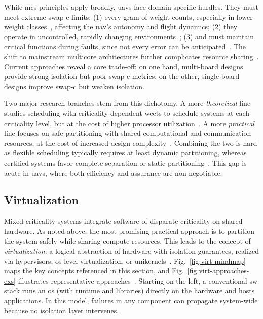While \gls{mcs} principles apply broadly, \glspl{uav} face domain-specific
hurdles. They must meet extreme \gls{swap-c} limits: (1) every gram of weight
counts, especially in lower weight classes~\cite{alladi2022UAVBlockain}, affecting the \gls{uav}'s autonomy
and flight dynamics; (2) they operate in uncontrolled,
rapidly changing environments~\cite{faical_adaptive_2017}; (3) and must maintain critical functions during faults, since not every error can be
anticipated~\cite{mohsan2022towards}.
The
shift to mainstream multicore architectures further complicates resource
sharing~\cite{burns2022mixed}. Current approaches reveal a core trade-off: on
one hand, multi-board designs provide strong isolation but poor \gls{swap-c}
metrics; on the other, single-board designs improve \gls{swap-c} but weaken isolation.

Two major research branches stem from this dichotomy. A more \emph{theoretical}
line studies scheduling with criticality-dependent \glspl{wcet} to schedule
systems at each criticality level, but at the cost of higher processor utilization~\cite{lee_estimating_2023}. A more \emph{practical}
line focuses on safe partitioning with shared computational and communication
resources, at the cost of increased design complexity~\cite{cinque2022virtualizing}. Combining the two is
hard as flexible scheduling typically requires at least dynamic partitioning,
whereas certified systems favor complete separation or static
partitioning~\cite{burns2022mixed}. This gap is acute in \glspl{uav}, where both
efficiency and assurance are non-negotiable.

\subsection{Virtualization}%
\label{sec:virtualization}
Mixed-criticality systems integrate software of disparate criticality on shared
hardware. As noted above, the most promising practical approach is to partition
the system safely while sharing compute resources. This leads to the concept of
\emph{virtualization}: a logical abstraction of hardware with isolation
guarantees, realized via hypervisors, \gls{os}-level virtualization, or
unikernels~\cite{cinque2022virtualizing}.
%
Fig.~\ref{fig:virt-mindmap} maps the key concepts referenced in this section,
and Fig.~\ref{fig:virt-approaches-exs} illustrates representative
approaches~\cite{cinque2022virtualizing}. Starting on the left, a conventional
\gls{sw} stack runs an \gls{os} (with runtime and libraries) directly on the
hardware and hosts applications. In this model, failures in any component can
propagate system-wide because no isolation layer intervenes.

